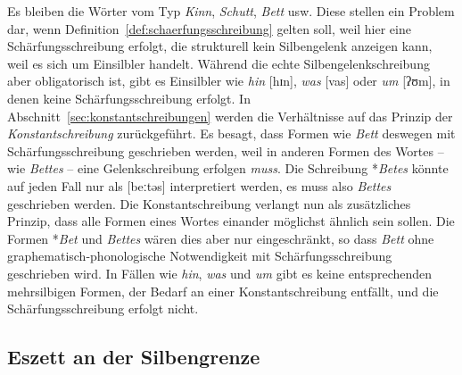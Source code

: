 

Es bleiben die Wörter vom Typ \textit{Kinn}, \textit{Schutt}, \textit{Bett} usw.
Diese stellen ein Problem dar, wenn Definition~\ref{def:schaerfungsschreibung} gelten soll, weil hier eine Schärfungsschreibung erfolgt, die strukturell kein Silbengelenk anzeigen kann, weil es sich um Einsilbler handelt.
Während die echte Silbengelenkschreibung aber obligatorisch ist, gibt es Einsilbler wie \textit{hin} [hɪn], \textit{was} [vas] oder \textit{um} [ʔʊm], in denen keine Schärfungsschreibung erfolgt.
In Abschnitt~\ref{sec:konstantschreibungen} werden die Verhältnisse auf das Prinzip der \textit{Konstantschreibung} zurückgeführt.
Es besagt, dass Formen wie \textit{Bett} deswegen mit Schärfungsschreibung geschrieben werden, weil in anderen Formen des Wortes -- wie \zB \textit{Bettes} -- eine Gelenkschreibung erfolgen \textit{muss}.
Die Schreibung *\textit{Betes} könnte auf jeden Fall nur als [beːtəs] interpretiert werden, es muss also \textit{Bettes} geschrieben werden.
Die Konstantschreibung verlangt nun als zusätzliches Prinzip, dass alle Formen eines Wortes einander möglichst ähnlich sein sollen.
Die Formen *\textit{Bet} und \textit{Bettes} wären dies aber nur eingeschränkt, so dass \textit{Bett} ohne graphematisch-phonologische Notwendigkeit mit Schärfungsschreibung geschrieben wird.
In Fällen wie \textit{hin}, \textit{was} und \textit{um} gibt es keine entsprechenden mehrsilbigen Formen, der Bedarf an einer Konstantschreibung entfällt, und die Schärfungsschreibung erfolgt nicht.


\subsection{Eszett an der Silbengrenze}
\label{sec:eszettandersilbengrenze}

